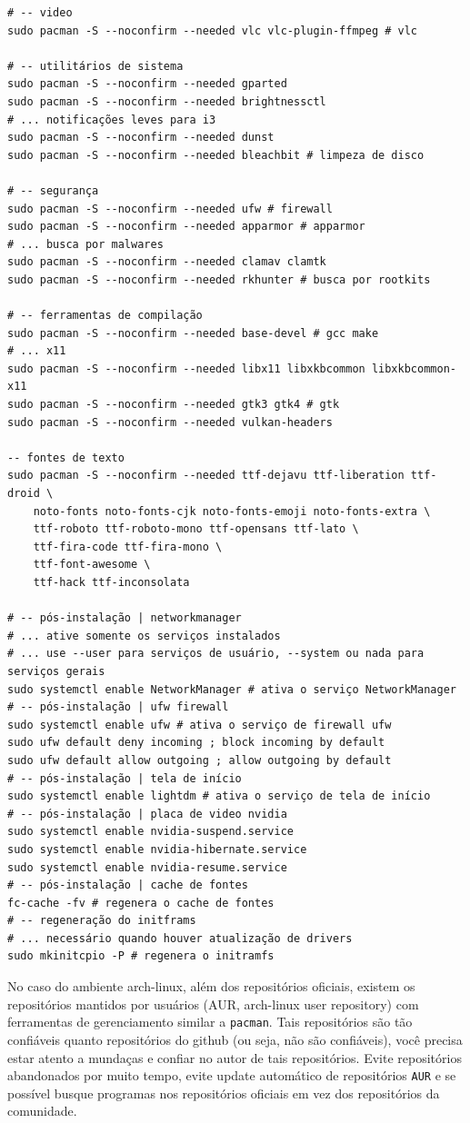 \documentclass[12pt,a4paper]{article}
\begin{document}
\begin{lstlisting}
# -- video 
sudo pacman -S --noconfirm --needed vlc vlc-plugin-ffmpeg # vlc 

# -- utilitários de sistema
sudo pacman -S --noconfirm --needed gparted
sudo pacman -S --noconfirm --needed brightnessctl 
# ... notificações leves para i3
sudo pacman -S --noconfirm --needed dunst 
sudo pacman -S --noconfirm --needed bleachbit # limpeza de disco

# -- segurança 
sudo pacman -S --noconfirm --needed ufw # firewall
sudo pacman -S --noconfirm --needed apparmor # apparmor
# ... busca por malwares
sudo pacman -S --noconfirm --needed clamav clamtk 
sudo pacman -S --noconfirm --needed rkhunter # busca por rootkits

# -- ferramentas de compilação 
sudo pacman -S --noconfirm --needed base-devel # gcc make
# ... x11
sudo pacman -S --noconfirm --needed libx11 libxkbcommon libxkbcommon-x11 
sudo pacman -S --noconfirm --needed gtk3 gtk4 # gtk 
sudo pacman -S --noconfirm --needed vulkan-headers

-- fontes de texto
sudo pacman -S --noconfirm --needed ttf-dejavu ttf-liberation ttf-droid \
    noto-fonts noto-fonts-cjk noto-fonts-emoji noto-fonts-extra \
    ttf-roboto ttf-roboto-mono ttf-opensans ttf-lato \
    ttf-fira-code ttf-fira-mono \
    ttf-font-awesome \
    ttf-hack ttf-inconsolata
    
# -- pós-instalação | networkmanager
# ... ative somente os serviços instalados
# ... use --user para serviços de usuário, --system ou nada para serviços gerais 
sudo systemctl enable NetworkManager # ativa o serviço NetworkManager
# -- pós-instalação | ufw firewall 
sudo systemctl enable ufw # ativa o serviço de firewall ufw 
sudo ufw default deny incoming ; block incoming by default
sudo ufw default allow outgoing ; allow outgoing by default
# -- pós-instalação | tela de início
sudo systemctl enable lightdm # ativa o serviço de tela de início 
# -- pós-instalação | placa de video nvidia 
sudo systemctl enable nvidia-suspend.service
sudo systemctl enable nvidia-hibernate.service
sudo systemctl enable nvidia-resume.service 
# -- pós-instalação | cache de fontes 
fc-cache -fv # regenera o cache de fontes 
# -- regeneração do initframs
# ... necessário quando houver atualização de drivers 
sudo mkinitcpio -P # regenera o initramfs
\end{lstlisting}

\vspace{\baselineskip}

No caso do ambiente arch-linux, além dos repositórios oficiais, existem os repositórios mantidos por usuários (AUR, arch-linux user repository) com ferramentas de gerenciamento similar a \texttt{pacman}. Tais repositórios são tão confiáveis quanto repositórios do github (ou seja, não são confiáveis), você precisa estar atento a mundaças e confiar no autor de tais repositórios. Evite repositórios abandonados por muito tempo, evite update automático de repositórios \texttt{AUR} e se possível busque programas nos repositórios oficiais em vez dos repositórios da comunidade.\\
\end{document}
